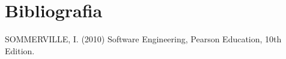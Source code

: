 \section{Bibliografia}

SOMMERVILLE, I. (2010) Software Engineering, Pearson Education, 10th Edition.